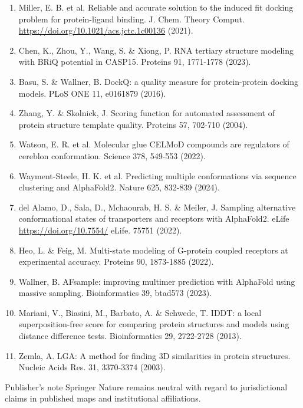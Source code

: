 \documentclass[10pt]{article}
\begin{document}
\begin{enumerate}
  \item Miller, E. B. et al. Reliable and accurate solution to the induced fit docking problem for protein-ligand binding. J. Chem. Theory Comput. \href{https://doi.org/10.1021/acs.jctc.1c00136}{https://doi.org/10.1021/acs.jctc.1c00136} (2021).
  \item Chen, K., Zhou, Y., Wang, S. \& Xiong, P. RNA tertiary structure modeling with BRiQ potential in CASP15. Proteins 91, 1771-1778 (2023).
  \item Basu, S. \& Wallner, B. DockQ: a quality measure for protein-protein docking models. PLoS ONE 11, e0161879 (2016).
  \item Zhang, Y. \& Skolnick, J. Scoring function for automated assessment of protein structure template quality. Proteins 57, 702-710 (2004).
  \item Watson, E. R. et al. Molecular glue CELMoD compounds are regulators of cereblon conformation. Science 378, 549-553 (2022).
  \item Wayment-Steele, H. K. et al. Predicting multiple conformations via sequence clustering and AlphaFold2. Nature 625, 832-839 (2024).
  \item del Alamo, D., Sala, D., Mchaourab, H. S. \& Meiler, J. Sampling alternative conformational states of transporters and receptors with AlphaFold2. eLife \href{https://doi.org/10.7554/}{https://doi.org/10.7554/} eLife. 75751 (2022).
  \item Heo, L. \& Feig, M. Multi-state modeling of G-protein coupled receptors at experimental accuracy. Proteins 90, 1873-1885 (2022).
  \item Wallner, B. AFsample: improving multimer prediction with AlphaFold using massive sampling. Bioinformatics 39, btad573 (2023).
  \item Mariani, V., Biasini, M., Barbato, A. \& Schwede, T. IDDT: a local superposition-free score for comparing protein structures and models using distance difference tests. Bioinformatics 29, 2722-2728 (2013).
  \item Zemla, A. LGA: A method for finding 3D similarities in protein structures. Nucleic Acids Res. 31, 3370-3374 (2003).
\end{enumerate}

Publisher's note Springer Nature remains neutral with regard to jurisdictional claims in published maps and institutional affiliations.
\end{document}
